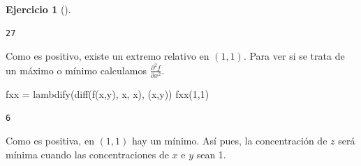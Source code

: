 \documentclass[
  a4paper,
]{scrreport}
\newenvironment{Shaded}{\begin{snugshade}}{\end{snugshade}}
\newcommand{\FloatTok}[1]{\textcolor[rgb]{0.68,0.00,0.00}{#1}}
\newcommand{\FunctionTok}[1]{\textcolor[rgb]{0.28,0.35,0.67}{#1}}
\newcommand{\NormalTok}[1]{\textcolor[rgb]{0.00,0.23,0.31}{#1}}
\newcommand{\OperatorTok}[1]{\textcolor[rgb]{0.37,0.37,0.37}{#1}}
\theoremstyle{definition}
\newtheorem{exercise}{Ejercicio}[chapter]
\theoremstyle{remark}
\begin{document}
\begin{exercise}[]
\begin{enumerate}
\begin{tcolorbox}
\begin{verbatim}
27
\end{verbatim}

  Como es positivo, existe un extremo relativo en \((1,1)\). Para ver si
  se trata de un máximo o mínimo calculamos
  \(\frac{\partial^2 f}{\partial x^2}\).

\begin{Shaded}
\begin{Highlighting}[]
\NormalTok{fxx }\OperatorTok{=} \FunctionTok{lambdify}\NormalTok{(}\FunctionTok{diff}\NormalTok{(}\FunctionTok{f}\NormalTok{(x,y), x, x), (x,y))}
\FunctionTok{fxx}\NormalTok{(}\FloatTok{1}\NormalTok{,}\FloatTok{1}\NormalTok{)}
\end{Highlighting}
\end{Shaded}

\begin{verbatim}
6
\end{verbatim}

  Como es positiva, en \((1,1)\) hay un mínimo. Así pues, la
  concentración de \(z\) será mínima cuando las concentraciones de \(x\)
  e \(y\) sean 1.

  \end{tcolorbox}
\end{enumerate}

\end{exercise}
\end{document}
